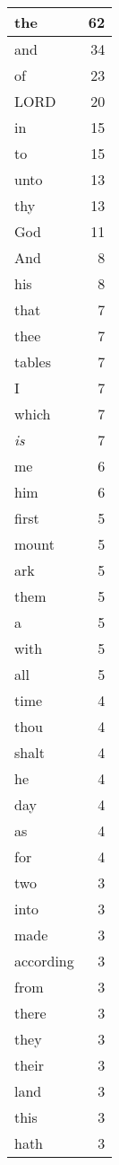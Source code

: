 \begin{center}
\begin{longtable}{l|r}
\hline \hline
\endlastfoot
the & 62 \\ \hline
and & 34 \\ \hline
of & 23 \\ \hline
LORD & 20 \\ \hline
in & 15 \\ \hline
to & 15 \\ \hline
unto & 13 \\ \hline
thy & 13 \\ \hline
God & 11 \\ \hline
And & 8 \\ \hline
his & 8 \\ \hline
that & 7 \\ \hline
thee & 7 \\ \hline
tables & 7 \\ \hline
I & 7 \\ \hline
which & 7 \\ \hline
\emph{is} & 7 \\ \hline
me & 6 \\ \hline
him & 6 \\ \hline
first & 5 \\ \hline
mount & 5 \\ \hline
ark & 5 \\ \hline
them & 5 \\ \hline
a & 5 \\ \hline
with & 5 \\ \hline
all & 5 \\ \hline
time & 4 \\ \hline
thou & 4 \\ \hline
shalt & 4 \\ \hline
he & 4 \\ \hline
day & 4 \\ \hline
as & 4 \\ \hline
for & 4 \\ \hline
two & 3 \\ \hline
into & 3 \\ \hline
made & 3 \\ \hline
according & 3 \\ \hline
from & 3 \\ \hline
there & 3 \\ \hline
they & 3 \\ \hline
their & 3 \\ \hline
land & 3 \\ \hline
this & 3 \\ \hline
hath & 3 \\ \hline

\end{longtable}
\end{center}
